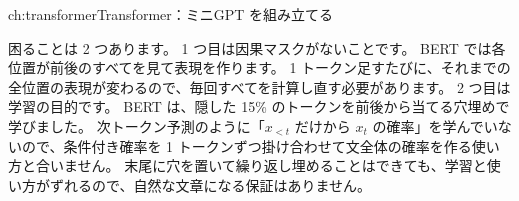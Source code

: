 \begin{answers}{ch:transformer}{Transformer：ミニGPT を組み立てる}
\item 困ることは 2 つあります。
1 つ目は因果マスクがないことです。
BERT では各位置が前後のすべてを見て表現を作ります。
1 トークン足すたびに、それまでの全位置の表現が変わるので、毎回すべてを計算し直す必要があります。
2 つ目は学習の目的です。
BERT は、隠した 15\% のトークンを前後から当てる穴埋めで学びました。
次トークン予測のように「$x_{<t}$ だけから $x_t$ の確率」を学んでいないので、条件付き確率を 1 トークンずつ掛け合わせて文全体の確率を作る使い方と合いません。
末尾に穴を置いて繰り返し埋めることはできても、学習と使い方がずれるので、自然な文章になる保証はありません。
\end{answers}
